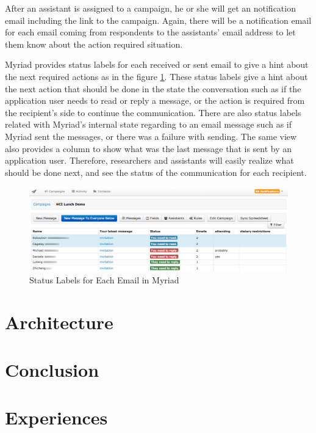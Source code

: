 After an assistant is assigned to a campaign, he or she will get an notification email including the link to the campaign. Again, there will be a notification email for each email coming from respondents to the assistants' email address to let them know about the action required situation.
\vspace{1cm}

Myriad provides status labels for each received or sent email to give a hint about the next required actions as in the figure \ref{fig:EmailStatuses}. These status labels give a hint about the next action that should be done in the state the conversation such as if the application user needs to read or reply a message, or the action is required from the recipient's side to continue the communication. There are also status labels related with Myriad's internal state regarding to an email message such as if Myriad sent the messages, or there was a failure with sending. The same view also provides a column to show what was the last message that is sent by an application user. Therefore, researchers and assistants will easily realize what should be done next, and see the status of the communication for each recipient. 

\begin{figure}[htbp]
	\centering
	\includegraphics[width=1.00\textwidth]{imgs/EmailStatuses.png}
	\caption[Status Labels for Each Email in Myriad]{Status Labels for Each Email in Myriad}
	\label{fig:EmailStatuses}
\end{figure}

\section{Architecture}
\label{sec:5.3:FinaArch}

\section{Conclusion}
\label{sec:5.4:Conc}

\section{Experiences}
\label{sec:5.5:Expr}

